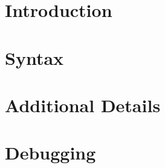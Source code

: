 \documentclass{report}[10pt]
\begin{document}
\sloppypar





\tableofcontents

\chapter{Introduction}
\label{Introduction}


\chapter{Syntax}
\label{Syntax}


\chapter{Additional Details}
\label{Additional Details}


\chapter{Debugging}
\label{Debugging}






\newpage

\cleardoublepage

\printindex[com]
\printindex[var]
\printindex
\end{document}
